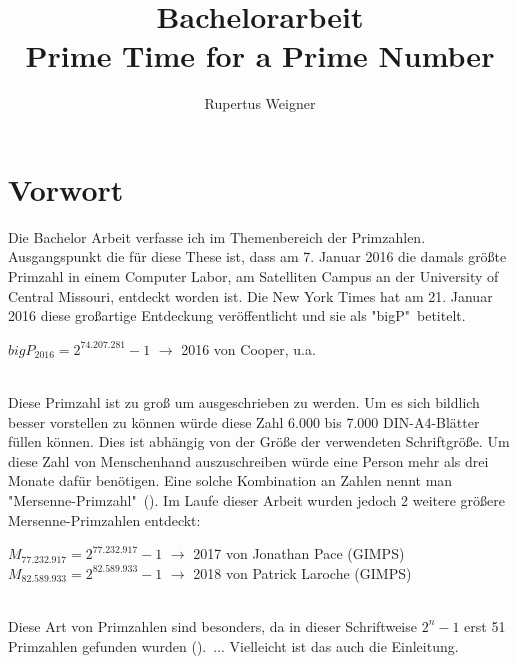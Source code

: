 \documentclass[german,12pt,a4paper]{article}
\title{Bachelorarbeit\\Prime Time for a Prime Number}
\author{Rupertus Weigner}
\begin{document}
\maketitle
\thispagestyle{empty}
\newpage

\section*{Vorwort}
Die Bachelor Arbeit verfasse ich im Themenbereich der Primzahlen.
Ausgangspunkt die für diese These ist, dass am 7. Januar 2016 die damals größte Primzahl in einem Computer Labor, am Satelliten Campus an der University of Central Missouri, entdeckt worden ist.
Die New York Times hat am 21. Januar 2016 diese großartige Entdeckung veröffentlicht und sie als "bigP"\ betitelt.\\
\begin{center}
$bigP_{2016} = 2^{74.207.281}-1$ $\rightarrow$ 2016 von Cooper, u.a.
\end{center}\
\\Diese Primzahl ist zu groß um ausgeschrieben zu werden.
Um es sich bildlich besser vorstellen zu können würde diese Zahl 6.000 bis 7.000 DIN-A4-Blätter füllen können.
Dies ist abhängig von der Größe der verwendeten Schriftgröße.
Um diese Zahl von Menschenhand auszuschreiben würde eine Person mehr als drei Monate dafür benötigen.
Eine solche Kombination an Zahlen nennt man "Mersenne-Primzahl"\ (\cite{TheNewYorkTimes2016}).
Im Laufe dieser Arbeit wurden jedoch 2 weitere größere Mersenne-Primzahlen entdeckt:\\
\begin{center}
$M_{77.232.917} = 2^{77.232.917}-1$ $\rightarrow$ 2017 von Jonathan Pace (GIMPS)\\
$M_{82.589.933} = 2^{82.589.933}-1$ $\rightarrow$ 2018 von Patrick Laroche (GIMPS)
\end{center}\
\\Diese Art von Primzahlen sind besonders, da in dieser Schriftweise $2^n-1$ erst 51 Primzahlen gefunden wurden (\cite{ListederMersennePrimzahlen2020}).\ ... Vielleicht ist das auch die Einleitung.
\newpage

\tableofcontents
\thispagestyle{empty}
\newpage
\end{document}
